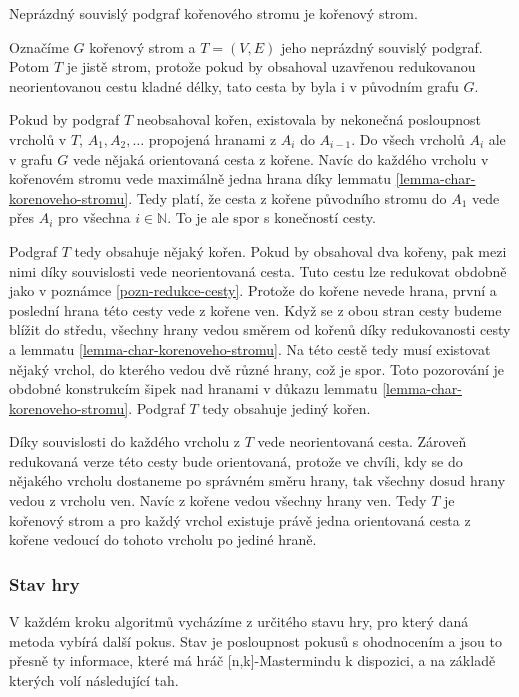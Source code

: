 \begin{tvrz}\label{tvrzeni-podgraf-korenoveho-stromu}
    Neprázdný souvislý podgraf kořenového stromu je kořenový strom.
\end{tvrz}
\begin{dukaz}
    Označíme $G$ kořenový strom a $T = (V,E)$ jeho neprázdný souvislý podgraf. Potom $T$ je jistě strom, protože pokud by obsahoval uzavřenou redukovanou neorientovanou cestu kladné délky, tato cesta by byla i v původním grafu $G$. 

    Pokud by podgraf $T$ neobsahoval kořen, existovala by nekonečná posloupnost vrcholů v $T$, $A_1, A_2, \dots$ propojená hranami z $A_i$ do $A_{i-1}$. Do všech vrcholů $A_i$ ale v grafu $G$ vede nějaká orientovaná cesta z kořene. Navíc do každého vrcholu v kořenovém stromu vede maximálně jedna hrana díky lemmatu \ref{lemma-char-korenoveho-stromu}. Tedy platí, že cesta z kořene původního stromu do $A_1$ vede přes $A_i$ pro všechna $i \in \mathbb{N}$. To je ale spor s konečností cesty. 

    Podgraf $T$ tedy obsahuje nějaký kořen. Pokud by obsahoval dva kořeny, pak mezi nimi díky souvislosti vede neorientovaná cesta. Tuto cestu lze redukovat obdobně jako v poznámce \ref{pozn-redukce-cesty}. Protože do kořene nevede hrana, první a poslední hrana této cesty vede z kořene ven. Když se z obou stran cesty budeme blížit do středu, všechny hrany vedou směrem od kořenů díky redukovanosti cesty a lemmatu \ref{lemma-char-korenoveho-stromu}. Na této cestě tedy musí existovat nějaký vrchol, do kterého vedou dvě různé hrany, což je spor. Toto pozorování je obdobné konstrukcím šipek nad hranami v důkazu lemmatu \ref{lemma-char-korenoveho-stromu}. Podgraf $T$ tedy obsahuje jediný kořen.
    
    Díky souvislosti do každého vrcholu z $T$ vede neorientovaná cesta. Zároveň redukovaná verze této cesty bude orientovaná, protože ve chvíli, kdy se do nějakého vrcholu dostaneme po správném směru hrany, tak všechny dosud  hrany vedou z vrcholu ven. Navíc z kořene vedou všechny hrany ven. Tedy $T$ je kořenový strom a pro každý vrchol existuje právě jedna orientovaná cesta z kořene vedoucí do tohoto vrcholu po jediné  hraně.
\end{dukaz}


\subsubsection{Stav hry}
V každém kroku algoritmů vycházíme z určitého stavu hry, pro který daná metoda vybírá další pokus. Stav je posloupnost pokusů s ohodnocením a jsou to přesně ty informace, které má hráč [n,k]-Mastermindu k dispozici, a na základě kterých volí následující tah.

